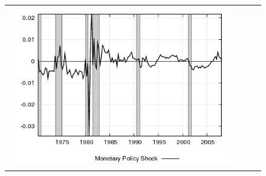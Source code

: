 \begin{figure}
\begin{tabular}{cccc}
\includegraphics[scale=0.22]{results_wlsinit/mpshock.png} \\ \\ 
 
\end{tabular}
\end{figure}

